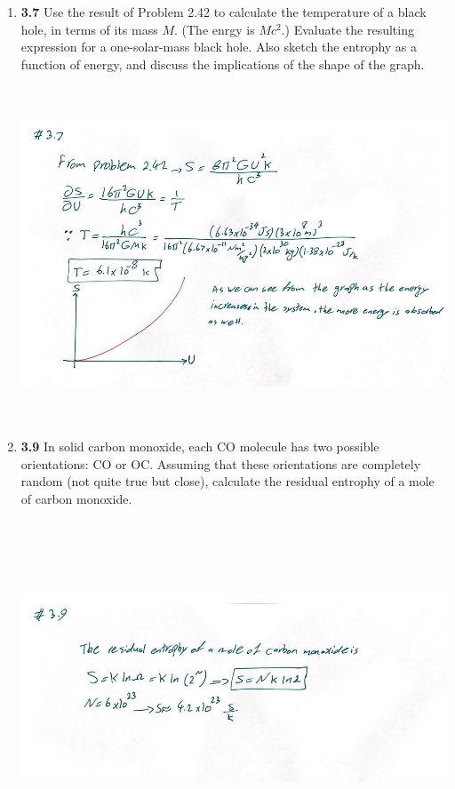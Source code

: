 \documentclass[fleqn]{article}
\begin{document}
\begin{enumerate}
    \pagebreak

    \item \textbf{3.7} Use the result of Problem 2.42 to calculate the temperature of a black hole, in terms
    of its mass $M$. (The enrgy is $Mc^2$.) Evaluate the resulting expression for a one-solar-mass black hole.
    Also sketch the entrophy as a function of energy, and discuss the implications of the shape of the graph. 

      \begin{center}
        \includegraphics[height=10cm, width=14cm]{3.JPG}
      \end{center}

    \pagebreak

    \item \textbf{3.9} In solid carbon monoxide, each CO molecule has two possible orientations: CO or 
    OC. Assuming that these orientations are completely random (not quite true but close), calculate
    the residual entrophy of a mole of carbon monoxide.

      \begin{center}
        \includegraphics[height=10cm, width=14cm]{4.JPG}
      \end{center}


\end{enumerate}
\end{document}

